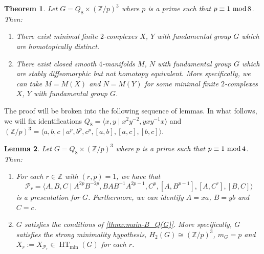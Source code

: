 \documentclass[11pt,a4paper,leqno]{amsart}
\newtheorem{theorem}{Theorem}[section]
\newtheorem{lemma}[theorem]{Lemma}
\theoremstyle{definition}
\theoremstyle{remark}
\newenvironment{clist}[1]
{\begin{enumerate}[\normalfont #1]}
{\end{enumerate}}
\newcommand{\Z}{\mathbb{Z}}
\renewcommand{\mod}{\,\,\text{\normalfont mod}\,}
\DeclareMathOperator{\HT}{HT}
\begin{document}
\begin{theorem} \label{thm:Q8xCp^3}
Let $G = Q_8 \times (\Z/p)^3$ where $p$ is a prime such that $p \equiv 1 \mod 8$. Then:
\begin{clist}{(i)}
\item
There exist minimal finite $2$-complexes $X$, $Y$ with fundamental group $G$ which are homotopically distinct.
\item
There exist closed smooth $4$-manifolds $M$, $N$ with fundamental group $G$ which are stably diffeomorphic but not homotopy equivalent. More specifically, we can take $M = M(X)$ and $N = M(Y)$ for some minimal finite $2$-complexes $X$, $Y$ with fundamental group $G$.
\end{clist}
\end{theorem}

The proof will be broken into the following sequence of lemmas. In what follows, we will fix identifications $Q_8 = \langle x,y \mid x^2y^{-2},yxy^{-1}x\rangle$ and $(\Z/p)^3 = \langle a,b,c \mid a^p,b^p,c^p,[a,b],[a,c],[b,c]\rangle$.

\begin{lemma} \label{lemma:Q8-presentations}
Let $G = Q_8 \times (\Z/p)^3$ where $p$ is a prime such that $p \equiv 1 \mod 4$. Then:
\begin{clist}{(i)}
\item
For each $r \in \Z$ with $(r,p)=1$, we have that
\[ \mathcal{P}_r = \langle A, B, C \mid A^{2p}B^{-2p}, BAB^{-1}A^{2p-1}, C^p, [A,B^{p-1}], [A,C^r], [B,C]\rangle\]
is a presentation for $G$. Furthermore, we can identify $A=xa$, $B=yb$ and $C=c$.
\item
$G$ satisfies the conditions of \cref{thmx:main-B_Q(G)}. More specifically, $G$ satisfies the strong minimality hypothesis, $H_2(G) \cong (\Z/p)^3$, $m_G = p$ and $X_r := X_{\mathcal{P}_r} \in \HT_{\min}(G)$ for each $r$.
\end{clist}
\end{lemma}
\end{document}
